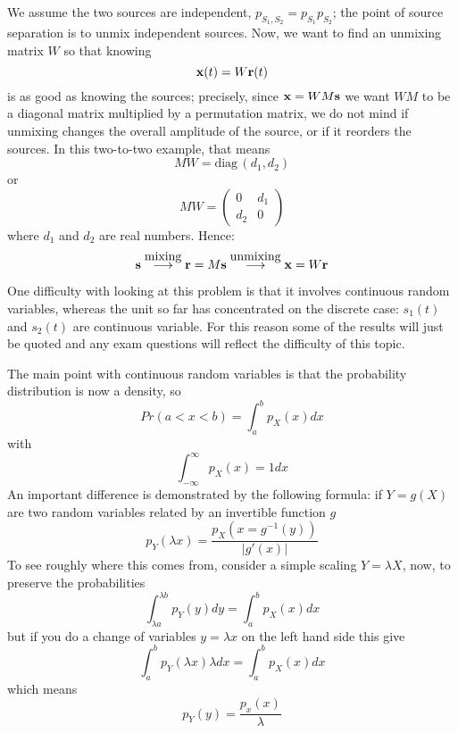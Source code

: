 \documentclass[12pt]{article}
\begin{document}
We assume the two sources are independent,
$p_{S_1,S_2}=p_{S_1}p_{S_2}$; the point of source separation is to
unmix independent sources. Now, we want to find an unmixing matrix $W$ so that knowing
\begin{equation} {\bf x}(t)=W{\bf r}(t) \end{equation} is as good as
knowing the sources; precisely, since ${\bf x}=WM{\bf s}$ we want $WM$
to be a diagonal matrix multiplied by a permutation matrix, we do not
mind if unmixing changes the overall amplitude of the source, or if it
reorders the sources. In this two-to-two example, that means
\begin{equation} MW=\mbox{diag}\,(d_1,d_2) \end{equation} or
\begin{equation}
MW=\left(\begin{array}{cc}0&d_1\\d_2&0\end{array}\right)
\end{equation} where $d_1$ and $d_2$ are real numbers. Hence:
\begin{equation} {\bf s}\stackrel{\mbox{mixing}}{\longrightarrow}{\bf
r}=M{\bf s}\stackrel{\mbox{unmixing}}{\longrightarrow}{\bf x}=W{\bf r}
\end{equation}

One difficulty with looking at this problem is that it involves
continuous random variables, whereas the unit so far has
concentrated on the discrete case: $s_1(t)$ and $s_2(t)$ are continuous
variable. For this reason some of the results will just be quoted and
any exam questions will reflect the difficulty of this topic.

The main point with continuous random variables is that the
probability distribution is now a density, so 
\begin{equation}
Pr(a<x<b)=\int_a^b p_X(x) dx 
\end{equation} 
with 
\begin{equation}
\int_{-\infty}^{\infty} p_X(x)=1 dx
\end{equation} 
An important difference is demonstrated by the following formula: if
$Y=g(X)$ are two random variables related by an invertible function
$g$ 
\begin{equation} 
p_Y(\lambda x)=\frac{p_X(x=g^{-1}(y))}{|g'(x)|}
\end{equation} 
To see roughly where this comes from, consider a simple scaling
$Y=\lambda X$, now, to preserve the probabilities
\begin{equation}
\int_{\lambda a}^{\lambda b} p_Y(y)dy=\int_{a}^b p_X(x)dx
\end{equation}
but if you do a change of variables $y=\lambda x$ on the left hand side this give
\begin{equation}
\int_a^b p_Y(\lambda x)\lambda dx=\int_{a}^b p_X(x)dx
\end{equation}
which means
\begin{equation}
p_Y(y)=\frac{p_x(x)}{\lambda}
\end{equation}
\end{document}
